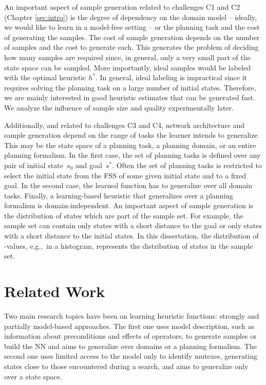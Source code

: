 An important aspect of sample generation related to challenges C1 and C2 (Chapter \ref{sec:intro}) is the degree of dependency on the domain model -- ideally, we would like to learn in a model-free setting -- or the planning task and the cost of generating the samples. The cost of sample generation depends on the number of samples and the cost to generate each. This generates the problem of deciding how many samples are required since, in general, only a very small part of the state space can be sampled. More importantly, ideal samples would be labeled with the optimal heuristic $h^*$. In general, ideal labeling is impractical since it requires solving the planning task on a large number of initial states. Therefore, we are mainly interested in good heuristic estimates that can be generated fast. We analyze the influence of sample size and quality experimentally later.

Additionally, and related to challenges C3 and C4, network architecture and sample generation depend on the range of tasks the learner intends to generalize. This may be the state space of a planning task, a planning domain, or an entire planning formalism. In the first case, the set of planning tasks is defined over any pair of initial state~$s_0$ and goal~$s^*$. Often the set of planning tasks is restricted to select the initial state from the FSS of some given initial state and to a fixed goal. In the second case, the learned function has to generalize over all domain tasks. Finally, a learning-based heuristic that generalizes over a planning formalism is domain-independent. An important aspect of sample generation is the distribution of states which are part of the sample set. For example, the sample set can contain only states with a short distance to the goal or only states with a short distance to the initial states. In this dissertation, the distribution of \hstar-values, e.g.,~in a histogram, represents the distribution of states in the sample set.

\section{Related Work}
\label{sec:background_relatedwork}

Two main research topics have been on learning heuristic functions: strongly and partially model-based approaches. The first one uses model description, such as information about preconditions and effects of operators, to generate samples or build the NN and aims to generalize over domains or a planning formalism. The second one uses limited access to the model only to identify mutexes, generating states close to those encountered during a search, and aims to generalize only over a state space.

